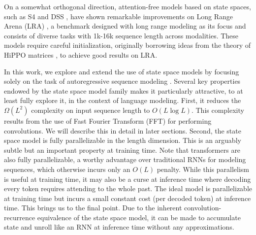On a somewhat orthogonal direction, attention-free models based on state spaces, such as S4 \citep{gu2022efficiently} and DSS \citep{dss_gupta2022diagonal}, have shown remarkable improvements on Long Range Arena (LRA) \citep{tay2020long}, a benchmark designed with long range modeling as its focus and consists of diverse tasks with 1k-16k sequence length across modalities. These models require careful initialization, originally borrowing ideas from the theory of HiPPO matrices \citep{Voelker2019LegendreMU,gu2020hippo}, to achieve good results on LRA.

In this work, we explore and extend the use of state space models by focusing solely on the task of autoregressive sequence modeling \citep{brown2020language,gopher_rae2021scaling,chowdhery2022palm,zhang2022opt175b,chinchilla_hoffmann2022training,bigbench_srivastava2022imitation}. Several key properties endowed by the state space model family makes it particularly attractive, to at least fully explore it, in the context of language modeling. First, it reduces the $\Omega(L^2)$ complexity on input sequence length to $O(L\log L)$. This complexity results from the use of Fast Fourier Transform (FFT) \citep{Cooley1965AnAF} for performing convolutions. We will describe this in detail in later sections. Second, the state space model is fully parallelizable in the length dimension. This is an arguably subtle but an important property at training time. Note that transformers are also fully parallelizable, a worthy advantage over traditional RNNs for modeling sequences, which otherwise incurs only an $O(L)$ penalty. While this parallelism is useful at training time, it may also be a curse at inference time where decoding every token requires attending to the whole past. The ideal model is parallelizable at training time but incurs a small constant cost (per decoded token) at inference time. This brings us to the final point. Due to the inherent convolution-recurrence equivalence of the state space model, it can be made to accumulate state and unroll like an RNN at inference time without any approximations. 

